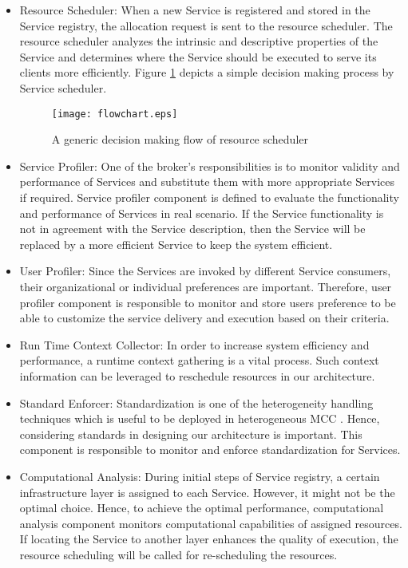 \documentclass[conference]{IEEEtran}
\begin{document}
\begin{itemize}
\item Resource Scheduler: When a new Service is registered and stored in the Service registry, the allocation request is sent to the resource scheduler. The resource scheduler analyzes the intrinsic and descriptive properties of the Service and determines where the Service should be executed to serve its clients more efficiently. Figure \ref{flowchart} depicts a simple decision making process by Service scheduler.  

\begin{figure}[!ht]
\begin{center}
\texttt{[image: flowchart.eps]} 
\caption{A generic decision making flow of resource scheduler} \label{flowchart}
\end{center}
\end{figure}

\item Service Profiler: One of the broker's responsibilities is to monitor validity and performance of Services and substitute them with more appropriate Services if required. Service profiler component is defined to evaluate the functionality and performance of Services in real scenario. If the Service functionality is not in agreement with the Service description, then the Service will be replaced by a more efficient Service to keep the system efficient.

\item User Profiler: Since the Services are invoked by different Service consumers, their organizational or individual preferences are important. Therefore, user profiler component is responsible to monitor and store users preference to be able to customize the service delivery and execution based on their criteria.

\item Run Time Context Collector: In order to increase system efficiency and performance, a runtime context gathering is a vital process. Such context information can be leveraged to reschedule resources in our architecture.

\item Standard Enforcer: Standardization is one of the heterogeneity handling techniques which is useful to be deployed in heterogeneous MCC \cite{ZohrehSanaei2012}. Hence, considering standards in designing our architecture is important. This component is responsible to monitor and enforce standardization for Services.

\item Computational Analysis: 
During initial steps of Service registry, a certain infrastructure layer is assigned to each Service. However, it might not be the optimal choice. Hence, to achieve the optimal performance, computational analysis component monitors computational capabilities of assigned resources. If locating the Service to another layer enhances the quality of execution, the resource scheduling will be called for re-scheduling the resources. 


\end{itemize}
\end{document}
